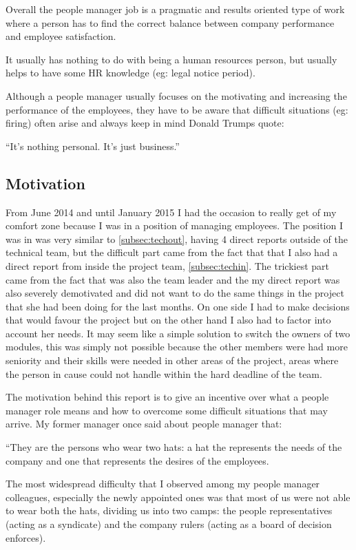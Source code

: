 Overall the people manager job is a pragmatic and results oriented type of work where a person has to find the correct balance between company performance and employee satisfaction.

It usually has nothing to do with being a human resources person, but usually helps to have some HR knowledge (eg: legal notice period). 

Although a people manager usually focuses on the motivating and increasing the performance of the employees, they have to be aware that difficult situations (eg: firing) often arise and always keep in mind Donald Trumps quote:

\begin{displayquote}
``It's nothing personal. It's just business.''
\end{displayquote}

\subsection{Motivation}
\label{sub-sec:Motivation}

From June 2014 and until January 2015 I had the occasion to really get of my comfort zone because I was in a position of managing employees. The position I was in was very similar to \ref{subsec:techout}, having 4 direct reports outside of the technical team, but the difficult part came from the fact that that I also had a direct report from inside the project team, \ref{subsec:techin}. The trickiest part came from the fact that was also the team leader and the my direct report was also severely demotivated and did not want to do the same things in the project that she had been doing for the last months. On one side I had to make decisions that would favour the project but on the other hand I also had to factor into account her needs. It may seem like a simple solution to switch the owners of two modules, this was simply not possible because the other members were had more seniority and their skills were needed in other areas of the project, areas where the person in cause could not handle within the hard deadline of the team.

The motivation behind this report is to give an incentive over what a people manager role means and how to overcome some difficult situations that may arrive. My former manager once said about people manager that:
\begin{displayquote}
``They are the persons who wear two hats: a hat the represents the needs of the company and one that represents the desires of the employees.
\end{displayquote}
The most widespread difficulty that I observed among my people manager colleagues, especially the newly appointed ones was that most of us were not able to wear both the hats, dividing us into two camps: the people representatives (acting as a syndicate) and the company rulers (acting as a board of decision enforces).

